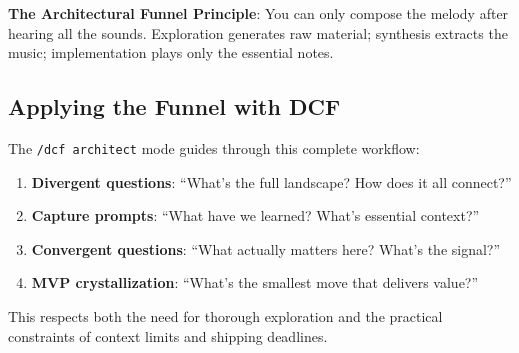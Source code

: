 \begin{quotebox}
\textbf{The Architectural Funnel Principle}: You can only compose the melody after hearing all the sounds. Exploration generates raw material; synthesis extracts the music; implementation plays only the essential notes.
\end{quotebox}

\subsection{Applying the Funnel with DCF}

The \texttt{/dcf architect} mode guides through this complete workflow:
\begin{enumerate}
    \item \textbf{Divergent questions}: ``What's the full landscape? How does it all connect?''
    \item \textbf{Capture prompts}: ``What have we learned? What's essential context?''
    \item \textbf{Convergent questions}: ``What actually matters here? What's the signal?''
    \item \textbf{MVP crystallization}: ``What's the smallest move that delivers value?''
\end{enumerate}

This respects both the need for thorough exploration and the practical constraints of context limits and shipping deadlines.

